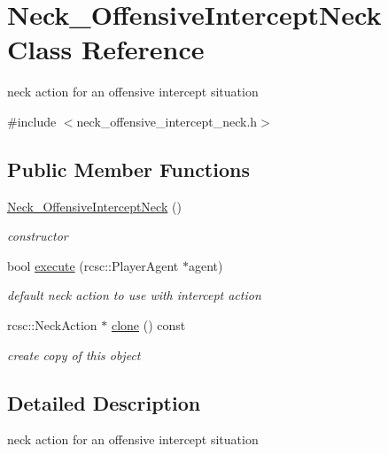 \hypertarget{classNeck__OffensiveInterceptNeck}{
\section{Neck\_\-OffensiveInterceptNeck Class Reference}
\label{classNeck__OffensiveInterceptNeck}
}


neck action for an offensive intercept situation  




{\ttfamily \#include $<$neck\_\-offensive\_\-intercept\_\-neck.h$>$}

\subsection*{Public Member Functions}
\begin{DoxyCompactItemize}
\item 
\hypertarget{classNeck__OffensiveInterceptNeck_ac7588f684dd3c4a3eab9970730e67f78}{
\hyperlink{classNeck__OffensiveInterceptNeck_ac7588f684dd3c4a3eab9970730e67f78}{Neck\_\-OffensiveInterceptNeck} ()}
\label{classNeck__OffensiveInterceptNeck_ac7588f684dd3c4a3eab9970730e67f78}

\begin{DoxyCompactList}\small\item\em constructor \item\end{DoxyCompactList}\item 
bool \hyperlink{classNeck__OffensiveInterceptNeck_a08c618ebd496d38943bf4ab00d26cb39}{execute} (rcsc::PlayerAgent $\ast$agent)
\begin{DoxyCompactList}\small\item\em default neck action to use with intercept action \item\end{DoxyCompactList}\item 
rcsc::NeckAction $\ast$ \hyperlink{classNeck__OffensiveInterceptNeck_a0ee57be79b4a810befb7adef0d5b4c23}{clone} () const 
\begin{DoxyCompactList}\small\item\em create copy of this object \item\end{DoxyCompactList}\end{DoxyCompactItemize}


\subsection{Detailed Description}
neck action for an offensive intercept situation 

